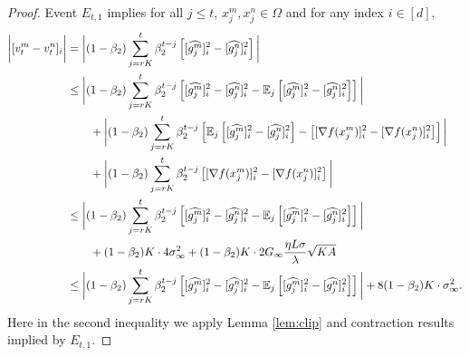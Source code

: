 \documentclass{article} %
\numberwithin{equation}{section}
\begin{document}
\begin{proof}
    Event $E_{t,1}$ implies for all $j\leq t$, $x_j^m,x_j^n\in \Omega$ and for any index $i\in [d]$,
    \begin{equation}
        \begin{aligned}
            \bigg|[v_t^m-v_t^n]_i\bigg|
            &= \bigg|(1-\beta_2)\sum_{j=rK}^t\beta_2^{t-j}\left[[\widehat{g_j^m}]_i^2-[\widehat{g_j^n}]_i^2\right]\bigg| \\
            &\leq \bigg|(1-\beta_2)\sum_{j=rK}^t\beta_2^{t-j}\left[[\widehat{g_j^m}]_i^2-[\widehat{g_j^n}]_i^2-\mathbb{E}_j\left[[\widehat{g_j^m}]_i^2-[\widehat{g_j^n}]_i^2\right]\right]\bigg| \\
            &\qquad + \bigg|(1-\beta_2)\sum_{j=rK}^t\beta_2^{t-j}\left[\mathbb{E}_j\left[[\widehat{g_j^m}]_i^2-[\widehat{g_j^n}]_i^2\right]-\left[[\nabla f(x_j^m)]_i^2-[\nabla f(x_j^n)]_i^2\right]\right]\bigg| \\
            &\qquad + \bigg|(1-\beta_2)\sum_{j=rK}^t\beta_2^{t-j}\left[[\nabla f(x_j^m)]_i^2-[\nabla f(x_j^n)]_i^2\right]\bigg| \\
            &\leq \bigg|(1-\beta_2)\sum_{j=rK}^t\beta_2^{t-j}\left[[\widehat{g_j^m}]_i^2-[\widehat{g_j^n}]_i^2-\mathbb{E}_j\left[[\widehat{g_j^m}]_i^2-[\widehat{g_j^n}]_i^2\right]\right]\bigg| \\
            &\qquad + (1-\beta_2)K\cdot 4\sigma_\infty^2 + (1-\beta_2)K\cdot 2G_{\infty}\frac{\eta L\sigma}{\lambda}\sqrt{KA} \\
            &\leq \bigg|(1-\beta_2)\sum_{j=rK}^t\beta_2^{t-j}\left[[\widehat{g_j^m}]_i^2-[\widehat{g_j^n}]_i^2-\mathbb{E}_j\left[[\widehat{g_j^m}]_i^2-[\widehat{g_j^n}]_i^2\right]\right]\bigg| + 8(1-\beta_2)K\cdot \sigma_\infty^2.
        \end{aligned}
    \end{equation}
    Here in the second inequality we apply Lemma \ref{lem:clip} and contraction results implied by $E_{t,1}$.
    

\end{proof}
\end{document}

